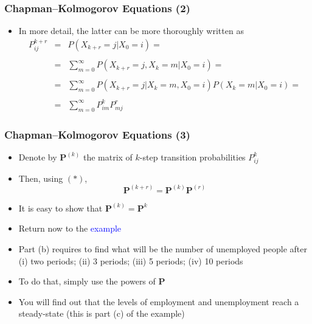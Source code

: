 \documentclass[10pt]{beamer}
\theoremstyle{definition}
\begin{document}
\begin{frame}[fragile]
	\frametitle{Chapman–Kolmogorov Equations (2)}
	\begin{itemize}
		\item In more detail, the latter can be more thoroughly written as
		\[
			\begin{array}{lcl}
				P_{ij}^{k + r} & = & P(X_{k + r} = j | X_{0} = i) = \\
				\quad\\
				& = & \displaystyle\sum_{m = 0}^{\infty} P(X_{k + r} = j, X_{k} = m | X_{0} = i) = \\
				\quad\\
				& = & \displaystyle\sum_{m = 0}^{\infty} P(X_{k + r} = j | X_{k} = m, X_{0} = i)P(X_{k} = m | X_{0} = i) = \\ 
				\quad\\
				& = & \displaystyle\sum_{m = 0}^{\infty} P_{im}^{k}P_{mj}^{r}
			\end{array}
		\]
	\end{itemize}
\end{frame}

\begin{frame}[fragile]
	\frametitle{Chapman–Kolmogorov Equations (3)}
	\begin{itemize}
		\item Denote by $ \mathbf{P}^{(k)} $ the matrix of $ k $-step transition probabilities $ P_{ij}^{k} $
		
		\item Then, using $ (*) $,
		\[
			\mathbf{P}^{(k + r)} = \mathbf{P}^{(k)}\mathbf{P}^{(r)}
		\]
		
		\item It is easy to show that $ \mathbf{P}^{(k)} = \mathbf{P}^{k} $
		
		\item Return now to the \textcolor{blue}{example}
		
		\item Part (b) requires to find what will be the number of unemployed people after (i) two periods; (ii) 3 periods; (iii) 5 periods; (iv) 10 periods
		
		\item To do that, simply use the powers of $ \mathbf{P} $
		
		\item You will find out that the levels of employment and unemployment reach a steady-state (this is part (c) of the example)
	\end{itemize}
\end{frame}
\end{document}
